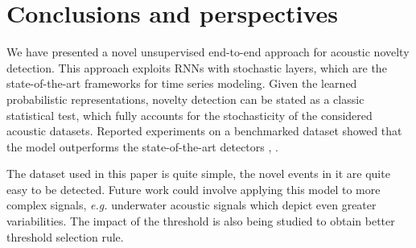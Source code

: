 \documentclass{article}
\begin{document}
 \section{Conclusions and perspectives}
\label{secConclusionsPerspectives}

We have presented a novel unsupervised end-to-end approach for acoustic novelty detection. This approach exploits RNNs with stochastic layers, which are the state-of-the-art frameworks for time series modeling.
Given the learned probabilistic representations, novelty detection can be stated as a classic statistical test, which fully accounts for the stochasticity of the considered acoustic datasets. Reported experiments on a benchmarked dataset showed that the model outperforms the state-of-the-art detectors \cite{marchi_novel_2015}, \cite{principi_acoustic_2017}.




The dataset used in this paper is quite simple, the novel events in it are quite easy to be detected. Future work could involve applying this model to more complex signals, {\em e.g.} underwater acoustic signals which depict even greater variabilities. The impact of the threshold is also being studied to obtain better threshold selection rule. 

 


\small

\end{document}
